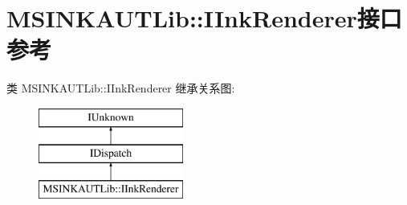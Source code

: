 \hypertarget{interface_m_s_i_n_k_a_u_t_lib_1_1_i_ink_renderer}{}\section{M\+S\+I\+N\+K\+A\+U\+T\+Lib\+:\+:I\+Ink\+Renderer接口 参考}
\label{interface_m_s_i_n_k_a_u_t_lib_1_1_i_ink_renderer}
类 M\+S\+I\+N\+K\+A\+U\+T\+Lib\+:\+:I\+Ink\+Renderer 继承关系图\+:\begin{figure}[H]
\begin{center}
\leavevmode
\includegraphics[height=3.000000cm]{interface_m_s_i_n_k_a_u_t_lib_1_1_i_ink_renderer}
\end{center}
\end{figure}
